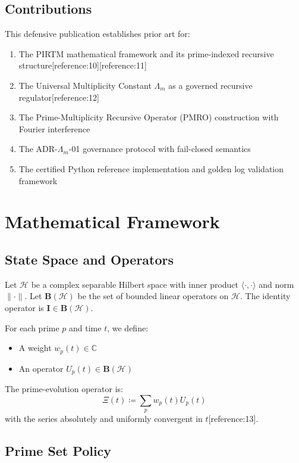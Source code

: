 \documentclass[11pt]{article}
\begin{document}
\subsection{Contributions}

This defensive publication establishes prior art for:
\begin{enumerate}
\item The PIRTM mathematical framework and its prime-indexed recursive structure[reference:10][reference:11]
\item The Universal Multiplicity Constant $\Lambda_m$ as a governed recursive regulator[reference:12]
\item The Prime-Multiplicity Recursive Operator (PMRO) construction with Fourier interference
\item The ADR-$\Lambda_m$-01 governance protocol with fail-closed semantics
\item The certified Python reference implementation and golden log validation framework
\end{enumerate}

\section{Mathematical Framework}

\subsection{State Space and Operators}

Let $\mathcal{H}$ be a complex separable Hilbert space with inner product $\langle \cdot, \cdot \rangle$ and norm $\|\cdot\|$. Let $\mathbf{B}(\mathcal{H})$ be the set of bounded linear operators on $\mathcal{H}$. The identity operator is $\mathbf{I} \in \mathbf{B}(\mathcal{H})$.

For each prime $p$ and time $t$, we define:
\begin{itemize}
\item A weight $w_p(t) \in \mathbb{C}$
\item An operator $U_p(t) \in \mathbf{B}(\mathcal{H})$
\end{itemize}

The prime-evolution operator is:
\[
\Xi(t) \coloneqq \sum_{p} w_p(t) U_p(t)
\]
with the series absolutely and uniformly convergent in $t$[reference:13].

\subsection{Prime Set Policy}
\end{document}
